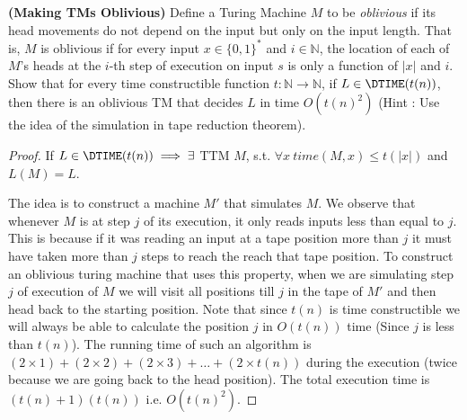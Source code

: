 \documentclass[solution,addpoints,12pt]{exam}
\newcommand{\HP}{\ensuremath{\mathrm{HP}}\xspace}
\newcommand{\Energy}{{\sc Energy}}
\newcommand{\Pol}{{\sc Police}}
\newcommand{\Mx}{\ensuremath{(M,x)}\xspace}
\begin{document}
\begin{questions}
\begin{solution}
\end{solution}
\question[7]\textbf{(Making TMs Oblivious)}
Define a Turing Machine $M$ to be \textit{oblivious} if its head movements do not depend on the input but only on the input length. That is, $M$ is oblivious if for every input $x \in \{0,1\}^*$ and $i \in \mathbb{N}$, the location of each of $M$'s heads at the $i$-th step of execution on input $s$ is only a function of $|x|$ and $i$. Show that for every time constructible function $t: \mathbb{N} \to \mathbb{N}$, if $L \in \DTIME(t(n))$, then there is an oblivious TM that decides $L$ in time $O(t(n)^2)$ (Hint : Use the idea of the simulation in tape reduction theorem).

\begin{solution}
	\begin{proof}
		If $L \in \DTIME(t(n)) \implies \exists$ TTM $M$, s.t. $\forall x~time(M,x) \leq t(|x|)$ and $L(M) = L$.
		
		The idea is to construct a machine $M'$ that simulates $M$. We observe that whenever $M$ is at step $j$ of its execution, it only reads inputs less than equal to $j$. This is because if it was reading an input at a tape position more than $j$ it must have taken more than $j$ steps to reach the reach that tape position. To construct an oblivious turing machine that uses this property, when we are simulating step $j$ of execution of $M$ we will visit all positions till $j$ in the tape of $M'$ and then head back to the starting position. Note that since $t(n)$ is time constructible we will always be able to calculate the position $j$ in $O(t(n))$ time (Since $j$ is less than $t(n)$). The running time of such an algorithm is $(2\times1) + (2\times2) + (2\times3) + \ldots+(2\times t(n))$ during the execution (twice because we are going back to the head position). The total execution time is $(t(n)+1)(t(n))$ i.e. $O(t(n)^2)$. 
		

\end{proof}
\end{solution}
\end{questions}
\end{document}
